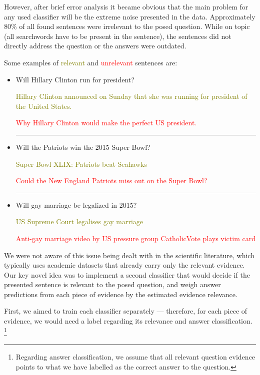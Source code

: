 \documentclass[11pt,a4paper]{article}
\begin{document}
However, after brief error analysis it became obvious that the main problem for any used classifier will be the extreme noise presented in the data.
Approximately 80\% of all found sentences were irrelevant to the posed question.
While on topic (all searchwords have to be present in the sentence),
the sentences did not directly address the question or the answers were outdated.

Some examples of \textcolor{olive}{relevant} and \textcolor{red}{unrelevant} sentences are:

\begin{itemize}

\item Will Hillary Clinton run for president?

\textcolor{olive}{Hillary Clinton announced on Sunday that she was running for president of the United States.}

\textcolor{red}{Why Hillary Clinton would make the perfect US president.}

\noindent\rule{8cm}{0.4pt}

\item Will the Patriots win the 2015 Super Bowl?

\textcolor{olive}{Super Bowl XLIX: Patriots beat Seahawks}

\textcolor{red}{Could the New England Patriots miss out on the Super Bowl?}

\noindent\rule{8cm}{0.4pt}

\item Will gay marriage be legalized in 2015?

\textcolor{olive}{US Supreme Court legalises gay marriage}

\textcolor{red}{Anti-gay marriage video by US pressure group CatholicVote plays victim card}

\end{itemize}

We were not aware of this issue being dealt with in the scientific literature,
which typically uses academic datasets that already carry only the relevant evidence.
Our key novel idea was to implement a second classifier that would decide if the presented sentence is relevant to the posed question,
and weigh answer predictions from each piece of evidence by the estimated evidence relevance.

First, we aimed to train each classifier separately --- therefore, for each piece of evidence,
we would need a label regarding its relevance and answer classification.%
\footnote{Regarding answer classification, we assume that all relevant question evidence points to what we have labelled as the correct answer to the question.}
\end{document}
